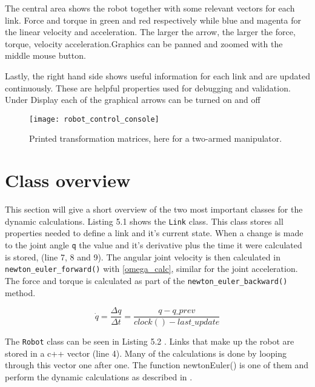 The central area shows the robot together with some relevant vectors for each link. Force and torque in green and red respectively while blue and magenta for the linear velocity and acceleration. The larger the arrow, the larger the force, torque, velocity acceleration.Graphics can be panned and zoomed with the middle mouse button.

Lastly, the right hand side shows useful information for each link and are updated continuously. These are helpful properties used for debugging and validation. Under \textsf{Display} each of the graphical arrows can be turned on and off

\begin{figure}[h!]
    \centering
    \texttt{[image: robot\_control\_console]}
    \caption{Printed transformation matrices, here for a two-armed manipulator.}
    \label{console}
\end{figure}


\section{Class overview}

This section will give a short overview of the two most important classes for the dynamic calculations. Listing 5.1  shows the \texttt{Link} class. This class stores all properties needed to define a link and it's current state. When a change is made to the joint angle \texttt{q} the value and it's derivative plus the time it were calculated is stored, (line 7, 8 and 9). The angular joint velocity is then calculated in \texttt{newton\_euler\_forward()} with \eqref{omega_calc}, similar for the joint acceleration. The force and torque is calculated as part of the \texttt{newton\_euler\_backward()} method.


\label{Link}

\begin{equation}\label{omega_calc}
\dot{q} = \frac{\Delta q}{\Delta t}=\frac{q-q\_prev}{clock()-last\_update}
\end{equation}

\label{Robot}

The \texttt{Robot} class can be seen in Listing 5.2 . Links that make up the robot are stored in a c++ vector (line 4). Many of the calculations is done by looping through this vector one after one. The function \textsf{newtonEuler()} is one of them and perform the dynamic calculations as described in .


